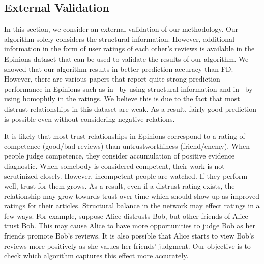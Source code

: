 \documentclass[acmtweb]{acmsmall}
\begin{document}
\subsection{External Validation} \label{sec:external}
In this section, we consider an external validation of our
methodology. Our algorithm solely considers the structural
information. However, additional information in the form of user
ratings of each other's reviews is available in the Epinions dataset
that can be used to validate the results of our algorithm. We showed
that our algorithm results in better prediction accuracy than
FD. However, there are various papers that report quite strong
prediction performance in Epinions such as
in~\cite{golbeck:distrust2011} by using structural information and
in~\cite{Tang:2013} by using homophily in the ratings. We believe this
is due to the fact that most distrust relationships in this dataset
are weak. As a result, fairly good prediction is possible even without
considering negative relations.

It is likely that most trust relationships in Epinions correspond to a
rating of competence (good/bad reviews) than untrustworthiness
(friend/enemy). When people judge competence, they consider
accumulation of positive evidence diagnostic. When somebody is
considered competent, their work is not scrutinized closely. However,
incompetent people are watched. If they perform well, trust for them
grows. As a result, even if a distrust rating exists, the relationship
may grow towards trust over time which should show up as improved
ratings for their articles. Structural balance in the network may
effect ratings in a few ways.  For example, suppose Alice distrusts
Bob, but other friends of Alice trust Bob. This may cause Alice to
have more opportunities to judge Bob as her friends promote Bob's
reviews. It is also possible that Alice starts to view Bob's reviews
more positively as she values her friends' judgment.  Our objective is
to check which algorithm captures this effect more accurately.
\end{document}
